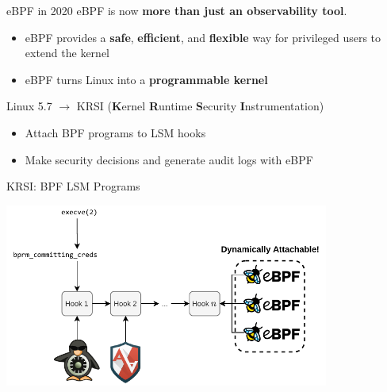 \documentclass[12pt, dvipsnames, aspectratio=169]{beamer}
\begin{document}
%
%
%
%

\begin{frame}[c]{eBPF in 2020}
eBPF is now \textbf{more than just an observability tool}.
\begin{itemize}
    \item eBPF provides a \textbf{safe}, \textbf{efficient}, and \textbf{flexible} way for privileged users to extend the kernel
    \item eBPF turns Linux into a \textbf{programmable kernel}
\end{itemize}
\vfill
Linux 5.7 $\rightarrow$ KRSI (\textbf{K}ernel \textbf{R}untime \textbf{S}ecurity \textbf{I}nstrumentation)
\begin{itemize}
    \item Attach BPF programs to LSM hooks
    \item Make security decisions and generate audit logs with eBPF
\end{itemize}
\end{frame}

\begin{frame}[c]{KRSI: BPF LSM Programs}
\begin{center}
    \color{black}
    \includegraphics[width=0.8\textwidth]{figs/ebpf-lsm.pdf}
\end{center}
\end{frame}
\end{document}
